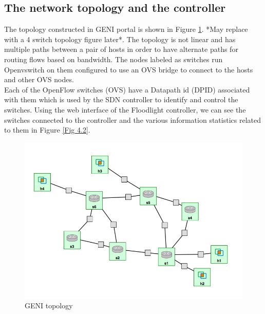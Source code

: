 \documentclass[paper=a4, fontsize=11pt]{scrartcl}	%
\numberwithin{equation}{section}		%
\numberwithin{figure}{section}			%
\numberwithin{table}{section}				%
\begin{document}
\subsection{The network topology and the controller}
The topology constructed in GENI portal is shown in Figure \ref{Fig 4.1}. *May replace with a 4 switch topology figure later*. The topology is not linear and has multiple paths between a pair of hosts in order to have alternate paths for routing flows based on bandwidth. The nodes labeled as switches run Openvswitch on them configured to use an OVS bridge to connect to the hosts and other OVS nodes.
\\
Each of the OpenFlow switches (OVS) have a Datapath id (DPID) associated with them which is used by the SDN controller to identify and control the switches. Using the web interface of the Floodlight controller, we can see the switches connected to the controller and the various information statistics related to them in Figure \ref{Fig 4.2}.
\begin{figure}[H]
\begin{center}
\includegraphics[scale=0.4]{topology.png}   
\end{center}
 \caption{GENI topology}
 \label{Fig 4.1}
\end{figure}
\end{document}

